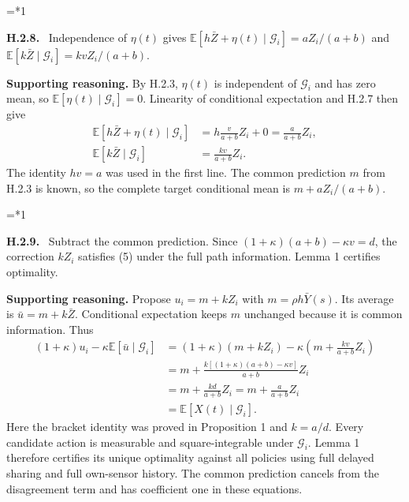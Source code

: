 \documentclass[12pt,letterpaper]{article}
\newcommand{\E}{\mathbb E}
\newcommand{\G}{\mathcal G}
\newenvironment{proofstep}[2]{%
  \begin{list}{}{\leftmargin=\dimexpr 0.17in*#2\relax%
  \setlength{\rightmargin}{0pt}\setlength{\topsep}{5pt}\setlength{\parsep}{2pt}}%
  \item[]\textbf{\textcolor{ink}{#1.}}\ }{\end{list}}
\begin{document}
\begin{proofstep}{H.2.8}{1}
\label{step:H.2.8}
Independence of $\eta(t)$ gives $\E[h\bar Z+\eta(t)\mid\mathcal G_i]=aZ_i/(a+b)$ and $\E[k\bar Z\mid\mathcal G_i]=kvZ_i/(a+b)$.

\textbf{Supporting reasoning.}
By H.2.3, $\eta(t)$ is independent of $\G_i$ and has zero mean, so $\E[\eta(t)\mid\G_i]=0$. Linearity of conditional expectation and H.2.7 then give
\begin{align*}
\E[h\bar Z+\eta(t)\mid\G_i]
&=h\frac{v}{a+b}Z_i+0=\frac{a}{a+b}Z_i,\\
\E[k\bar Z\mid\G_i]&=\frac{kv}{a+b}Z_i.
\end{align*}
The identity $hv=a$ was used in the first line. The common prediction $m$ from H.2.3 is known, so the complete target conditional mean is $m+aZ_i/(a+b)$.
\par{}
\end{proofstep}

\begin{proofstep}{H.2.9}{1}
\label{step:H.2.9}
Subtract the common prediction. Since $(1+\kappa)(a+b)-\kappa v=d$, the correction $kZ_i$ satisfies (5) under the full path information. Lemma 1 certifies optimality.

\textbf{Supporting reasoning.}
Propose $u_i=m+kZ_i$ with $m=\rho h\bar Y(s)$. Its average is $\bar u=m+k\bar Z$. Conditional expectation keeps $m$ unchanged because it is common information. Thus
\begin{align*}
(1+\kappa)u_i-\kappa\E[\bar u\mid\G_i]
&=(1+\kappa)(m+kZ_i)-\kappa\left(m+\frac{kv}{a+b}Z_i\right)\\
&=m+\frac{k[(1+\kappa)(a+b)-\kappa v]}{a+b}Z_i\\
&=m+\frac{kd}{a+b}Z_i=m+\frac{a}{a+b}Z_i\\
&=\E[X(t)\mid\G_i].
\end{align*}
Here the bracket identity was proved in Proposition 1 and $k=a/d$. Every candidate action is measurable and square-integrable under $\G_i$. Lemma 1 therefore certifies its unique optimality against all policies using full delayed sharing and full own-sensor history. The common prediction cancels from the disagreement term and has coefficient one in these equations.
\par{}
\end{proofstep}
\end{document}

